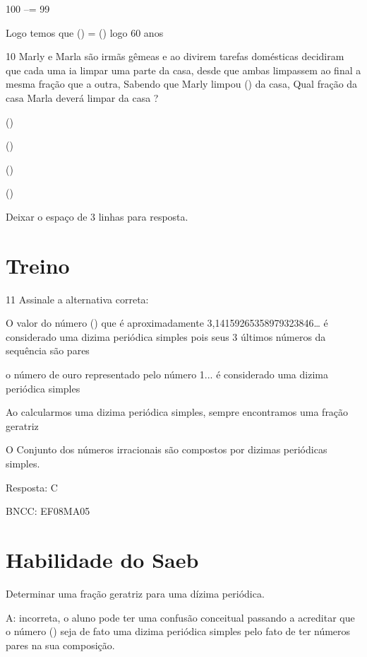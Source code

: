 100 --\times = 99

Logo temos que () = () logo 60 anos

\num{10} Marly e Marla são irmãs gêmeas e ao divirem tarefas domésticas
decidiram que cada uma ia limpar uma parte da casa, desde que ambas
limpassem ao final a mesma fração que a outra, Sabendo que Marly limpou
() da casa, Qual fração da casa Marla deverá limpar da casa ?

\item ()
\item ()
\item ()
\item ()

Deixar o espaço de 3 linhas para resposta.

\section{Treino}

\num{11} Assinale a alternativa correta:

\item O valor do número (\pi) que é aproximadamente
3,14159265358979323846\ldots{} é considerado uma dizima periódica
simples pois seus 3 últimos números da sequência são pares

\item o número de ouro representado pelo número 1... é considerado
uma dizima periódica simples

\item Ao calcularmos uma dizima periódica simples, sempre encontramos uma
fração geratriz

\item O Conjunto dos números irracionais são compostos por dizimas
periódicas simples.

Resposta: C

BNCC: EF08MA05

\section{Habilidade do Saeb}

Determinar uma fração geratriz para uma dízima periódica.

A: incorreta, o aluno pode ter uma confusão conceitual passando a
acreditar que o número (\pi) seja de fato uma dizima periódica simples
pelo fato de ter números pares na sua composição.

